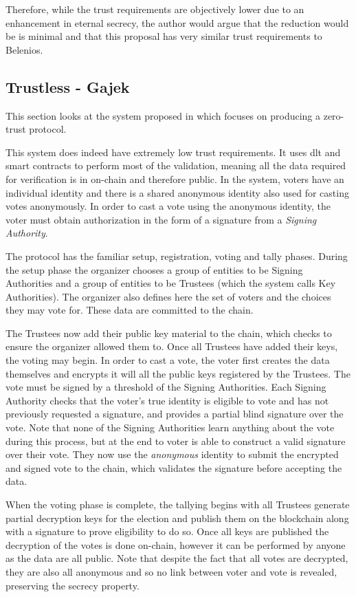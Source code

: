 Therefore, while the trust requirements are objectively lower due to an enhancement in eternal secrecy, the author would argue that the reduction would be is minimal and that this proposal has very similar trust requirements to Belenios.

\subsection{Trustless - Gajek}

This section looks at the system proposed in \cite{gajekTrustlessCensorshipResilientScalable2019} which focuses on producing a zero-trust protocol.

This system does indeed have extremely low trust requirements. It uses \gls{dlt} and smart contracts to perform most of the validation, meaning all the data required for verification is in on-chain and therefore public. In the system, voters have an individual identity and there is a shared anonymous identity also used for casting votes anonymously. In order to cast a vote using the anonymous identity, the voter must obtain authorization in the form of a signature from a \emph{Signing Authority}.

The protocol has the familiar setup, registration, voting and tally phases. During the setup phase the organizer chooses a group of entities to be Signing Authorities and a group of entities to be Trustees (which the system calls Key Authorities). The organizer also defines here the set of voters and the choices they may vote for. These data are committed to the chain.

The Trustees now add their public key material to the chain, which checks to ensure the organizer allowed them to. Once all Trustees have added their keys, the voting may begin. In order to cast a vote, the voter first creates the data themselves and encrypts it will all the public keys registered by the Trustees. The vote must be signed by a threshold of the Signing Authorities. Each Signing Authority checks that the voter's true identity is eligible to vote and has not previously requested a signature, and provides a partial blind signature over the vote. Note that none of the Signing Authorities learn anything about the vote during this process, but at the end to voter is able to construct a valid signature over their vote. They now use the \emph{anonymous} identity to submit the encrypted and signed vote to the chain, which validates the signature before accepting the data.

When the voting phase is complete, the tallying begins with all Trustees generate partial decryption keys for the election and publish them on the blockchain along with a signature to prove eligibility to do so. Once all keys are published the decryption of the votes is done on-chain, however it can be performed by anyone as the data are all public. Note that despite the fact that all votes are decrypted, they are also all anonymous and so no link between voter and vote is revealed, preserving the secrecy property.

